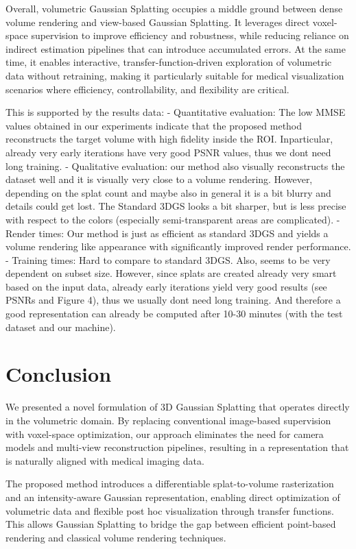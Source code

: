 \documentclass[runningheads]{llncs}
\begin{document}
Overall, volumetric Gaussian Splatting occupies a middle ground between dense volume rendering and view-based Gaussian Splatting. It leverages direct voxel-space supervision to improve efficiency and robustness, while reducing reliance on indirect estimation pipelines that can introduce accumulated errors. At the same time, it enables interactive, transfer-function-driven exploration of volumetric data without retraining, making it particularly suitable for medical visualization scenarios where efficiency, controllability, and flexibility are critical.


This is supported by the results data:
- Quantitative evaluation: The low MMSE values obtained in our experiments indicate that the proposed method reconstructs the target volume with high fidelity inside the ROI. Inparticular, already very early iterations have very good PSNR values, thus we dont need long training.
- Qualitative evaluation: our method also visually reconstructs the dataset well and it is visually very close to a volume rendering. However, depending on the splat count and maybe also in general it is a bit blurry and details could get lost. The Standard 3DGS looks a bit sharper, but is less precise with respect to the colors (especially semi-transparent areas are complicated). 
- Render times: Our method is just as efficient as standard 3DGS and yields a volume rendering like appearance with significantly improved render performance.
- Training times: Hard to compare to standard 3DGS. Also, seems to be very dependent on subset size. However, since splats are created already very smart based on the input data, already early iterations yield very good results (see PSNRs and Figure 4), thus we usually dont need long training. And therefore a good representation can already be computed after 10-30 minutes (with the test dataset and our machine).


\section{Conclusion}

We presented a novel formulation of 3D Gaussian Splatting that operates directly in the volumetric domain. By replacing conventional image-based supervision with voxel-space optimization, our approach eliminates the need for camera models and multi-view reconstruction pipelines, resulting in a representation that is naturally aligned with medical imaging data.

The proposed method introduces a differentiable splat-to-volume rasterization and an intensity-aware Gaussian representation, enabling direct optimization of volumetric data and flexible post hoc visualization through transfer functions. This allows Gaussian Splatting to bridge the gap between efficient point-based rendering and classical volume rendering techniques.
\end{document}
